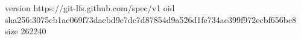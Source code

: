 version https://git-lfs.github.com/spec/v1
oid sha256:3075cb1ac069f73daebd9e7dc7d87854d9a526d1fe734ae399f972ecbf656bc8
size 262240
